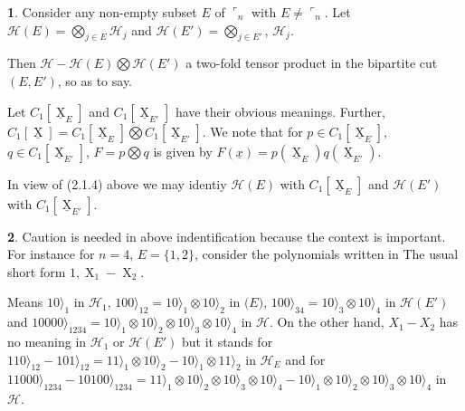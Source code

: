 \documentclass[a4paper,12pt]{article}
\DeclareMathOperator{\x}{\mathrm{X}}
\theoremstyle{definition}
\theoremstyle{underlinethm}
\theoremstyle{underline}
\newtheorem{subsubsec}{}[subsection]
\begin{document}
 \begin{subsubsec}\label{subsubsection-2.1.5}
 Consider any non-empty subset $E$ of $\ulcorner_{n}$ with $E \neq \ulcorner_{n}$. Let $\mathcal{H}(E) = \bigotimes\limits_{j \in E} \mathcal{H}_{j}$ and $\mathcal{H}(E') = \bigotimes\limits_{j \in E'}$, $\mathcal{H}_{j}$.
 
 Then $\mathcal{H} - \mathcal{H}(E) \bigotimes \mathcal{H}(E')$ a two-fold tensor product in the bipartite cut $(E, E')$, so as to say.
 
 Let $C_{1}[\underline{\x}_{E}]$ and  $C_{1}[\underline{\x}_{E'}]$ have their obvious meanings. Further, $C_{1}[\underline{\x}] = C_{1}[\underline{\x}_{E}] \bigotimes  C_{1}[\underline{\x}_{E'}]$. We note that for $p \in C_{1}[\underline{\x}_{E}]$, $q \in C_{1}[\underline{\x}_{E'}]$, $F = p \bigotimes q$ is given by $F(\underline{x}) = p (\underline{\x}_{E}) q (\underline{\x}_{E'})$.
 
 In view of (2.1.4) above we may identiy $\mathcal{H}(E)$ with $C_{1}[\underline{\x}_{E}]$ and $\mathcal{H}(E')$ with $C_{1}[\underline{\x}_{E'}]$.
 
 \end{subsubsec}
 
 \begin{subsubsec}\label{subsubsection-2.1.6}
 Caution is needed in above indentification because the context is important. For instance for $n=4$, $E = \{ 1, 2 \}$, consider the polynomials written in The usual short form $1, \x_{1}-\x_{2}$.
 
 Means $10 \rangle_{1}$ in $\mathcal{H}_{1}$, $100\rangle_{12} = 10 \rangle_{1} \otimes 10 \rangle_{2}$ in $\mathcal(E)$, $100 \rangle_{34} = 10\rangle_{3} \otimes 10 \rangle_{4}$ in $\mathcal{H}(E')$ and $10000\rangle_{1234} = 10 \rangle_{1} \otimes 10 \rangle_{2} \otimes 10 \rangle_{3} \otimes 10 \rangle_{4}$ in $\mathcal{H}$. On the other hand, $X_{1}-X_{2}$ has no meaning in $\mathcal{H}_{1}$ or $\mathcal{H}(E')$ but it stands for $110\rangle_{12} - 101\rangle_{12} = 11 \rangle_{1} \otimes 10 \rangle_{2} - 10 \rangle_{1} \otimes 11 \rangle_{2}$ in $\mathcal{H}_{E}$ and for $11000 \rangle_{1234} - 10100\rangle_{1234} = 11 \rangle_{1} \otimes 10 \rangle_{2} \otimes 10 \rangle_{3} \otimes 10 \rangle_{4}-10 \rangle_{1} \otimes 10 \rangle_{2} \otimes 10 \rangle_{3} \otimes 10 \rangle_{4} $ in $\mathcal{H}$.
\end{subsubsec} 
 
\end{document}
